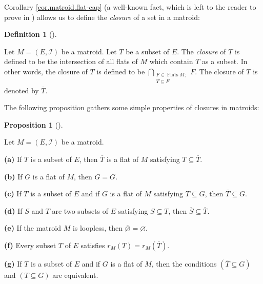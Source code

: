 \documentclass[numbers=enddot,12pt,final,onecolumn,notitlepage]{scrartcl}%
\theoremstyle{definition}
\newtheorem{prop}[theo]{Proposition}
\newenvironment{proposition}[1][]
{\begin{prop}[#1]\begin{leftbar}}
{\end{leftbar}\end{prop}}
\newtheorem{defi}[theo]{Definition}
\newenvironment{definition}[1][]
{\begin{defi}[#1]\begin{leftbar}}
{\end{leftbar}\end{defi}}
\let\bigcapnonlimits\bigcap
\renewcommand{\bigcap}{\bigcapnonlimits\limits}
\begin{document}
Corollary \ref{cor.matroid.flat-cap} (a well-known fact, which is left to the
reader to prove in \cite[\S 3.1]{Stanley}) allows us to define the
\textit{closure} of a set in a matroid:

\begin{definition}
\label{def.matroid.closure}Let $M=\left(  E,\mathcal{I}\right)  $ be a
matroid. Let $T$ be a subset of $E$. The \textit{closure} of $T$ is defined to
be the intersection of all flats of $M$ which contain $T$ as a subset. In
other words, the closure of $T$ is defined to be $\bigcap_{\substack{F\in
\operatorname*{Flats}M;\\T\subseteq F}}F$. The closure of $T$ is denoted by
$\overline{T}$.
\end{definition}

The following proposition gathers some simple properties of closures in matroids:

\begin{proposition}
\label{prop.matroid.closure.props}Let $M=\left(  E,\mathcal{I}\right)  $ be a matroid.

\textbf{(a)} If $T$ is a subset of $E$, then $\overline{T}$ is a flat of $M$
satisfying $T\subseteq\overline{T}$.

\textbf{(b)} If $G$ is a flat of $M$, then $\overline{G}=G$.

\textbf{(c)} If $T$ is a subset of $E$ and if $G$ is a flat of $M$ satisfying
$T\subseteq G$, then $\overline{T}\subseteq G$.

\textbf{(d)} If $S$ and $T$ are two subsets of $E$ satisfying $S\subseteq T$,
then $\overline{S}\subseteq\overline{T}$.

\textbf{(e)} If the matroid $M$ is loopless, then $\overline{\varnothing
}=\varnothing$.

\textbf{(f)} Every subset $T$ of $E$ satisfies $r_{M}\left(  T\right)
=r_{M}\left(  \overline{T}\right)  $.

\textbf{(g)} If $T$ is a subset of $E$ and if $G$ is a flat of $M$, then the
conditions $\left(  \overline{T}\subseteq G\right)  $ and $\left(  T\subseteq
G\right)  $ are equivalent.
\end{proposition}
\end{document}
